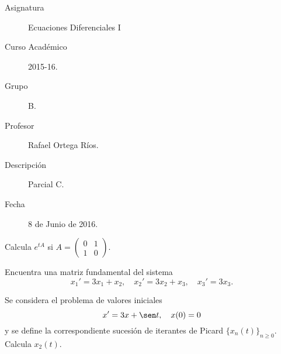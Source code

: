 \documentclass[12pt]{article}
\begin{document}

    
    

    \begin{description}
        \item[Asignatura] Ecuaciones Diferenciales I
        \item[Curso Académico] 2015-16.
        \item[Grupo] B.
        \item[Profesor] Rafael Ortega Ríos.
        \item[Descripción] Parcial C.
        \item[Fecha] 8 de Junio de 2016.
    
    \end{description}
    \newpage

    \begin{ejercicio}
        Calcula $e^{tA}$ si $\displaystyle A = \displaystyle
        \begin{pmatrix}
            0 & 1 \\
            1 & 0
        \end{pmatrix}$.
    \end{ejercicio}

    \begin{ejercicio}
        Encuentra una matriz fundamental del sistema
        \begin{equation*}
            x_1' = 3x_1 + x_2, \quad x_2' = 3x_2+x_3,\quad x_3' = 3x_3.
        \end{equation*}
    \end{ejercicio}

    \begin{ejercicio}
        Se considera el problema de valores iniciales
        \begin{equation*}
            x' = 3x+\sen t,\quad x(0) = 0
        \end{equation*}
        y se define la correspondiente sucesión de iterantes de Picard ${\{x_n(t)\}}_{n\geq 0}$. Calcula $x_2(t)$.
    \end{ejercicio}
\end{document}
